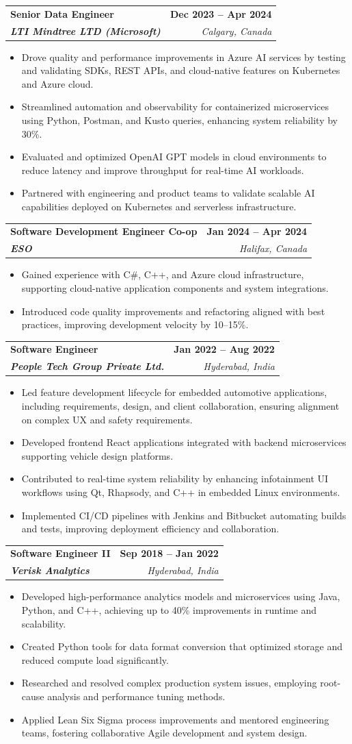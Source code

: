 \documentclass[letterpaper,11pt]{article}
\makeatletter
\newcommand{\resumeItem}[1]{
  \item\small{
    {#1 \vspace{-2pt}}
  }
}
\newcommand{\resumeSubheading}[4]{
  \vspace{-2pt}\item
    \begin{tabular*}{1.0\textwidth}[t]{l@{\extracolsep{\fill}}r}
      \textbf{#1} & \textbf{\small #2} \\
      \textit{\small#3} & \textit{\small #4} \\
    \end{tabular*}\vspace{-7pt}
}
\newcommand{\resumeItemListStart}{\begin{itemize}}
\newcommand{\resumeItemListEnd}{\end{itemize}\vspace{-5pt}}
\makeatother
\begin{document}
    \resumeSubheading
      {\textbf{Senior Data Engineer}}{\textbf{Dec 2023 -- Apr 2024}}
      {\textbf{LTI Mindtree LTD (Microsoft)}}{Calgary, Canada}
      \resumeItemListStart
        \resumeItem{Drove quality and performance improvements in Azure AI services by testing and validating SDKs, REST APIs, and cloud-native features on Kubernetes and Azure cloud.}
        \resumeItem{Streamlined automation and observability for containerized microservices using Python, Postman, and Kusto queries, enhancing system reliability by 30\%.}
        \resumeItem{Evaluated and optimized OpenAI GPT models in cloud environments to reduce latency and improve throughput for real-time AI workloads.}
        \resumeItem{Partnered with engineering and product teams to validate scalable AI capabilities deployed on Kubernetes and serverless infrastructure.}
      \resumeItemListEnd
    
    \resumeSubheading
      {\textbf{Software Development Engineer Co-op}}{\textbf{Jan 2024 -- Apr 2024}}
      {\textbf{ESO}}{Halifax, Canada}
      \resumeItemListStart
        \resumeItem{Gained experience with C\#, C++, and Azure cloud infrastructure, supporting cloud-native application components and system integrations.}
        \resumeItem{Introduced code quality improvements and refactoring aligned with best practices, improving development velocity by 10--15\%.}
      \resumeItemListEnd

    \resumeSubheading
      {\textbf{Software Engineer}}{\textbf{Jan 2022 -- Aug 2022}}
      {\textbf{People Tech Group Private Ltd.}}{Hyderabad, India}
      \resumeItemListStart
        \resumeItem{Led feature development lifecycle for embedded automotive applications, including requirements, design, and client collaboration, ensuring alignment on complex UX and safety requirements.}
        \resumeItem{Developed frontend React applications integrated with backend microservices supporting vehicle design platforms.}
        \resumeItem{Contributed to real-time system reliability by enhancing infotainment UI workflows using Qt, Rhapsody, and C++ in embedded Linux environments.}
        \resumeItem{Implemented CI/CD pipelines with Jenkins and Bitbucket automating builds and tests, improving deployment efficiency and collaboration.}
      \resumeItemListEnd

    \resumeSubheading
      {\textbf{Software Engineer II}}{\textbf{Sep 2018 -- Jan 2022}}
      {\textbf{Verisk Analytics}}{Hyderabad, India}
      \resumeItemListStart
        \resumeItem{Developed high-performance analytics models and microservices using Java, Python, and C++, achieving up to 40\% improvements in runtime and scalability.}
        \resumeItem{Created Python tools for data format conversion that optimized storage and reduced compute load significantly.}
        \resumeItem{Researched and resolved complex production system issues, employing root-cause analysis and performance tuning methods.}
        \resumeItem{Applied Lean Six Sigma process improvements and mentored engineering teams, fostering collaborative Agile development and system design.}
      \resumeItemListEnd
\end{document}
